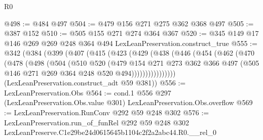 \begin{lexlean}{R0}
\begin{coremodule}
@498 := @484 @497
@504 := @479 @156 @271 @275 @362 @368 @497
@505 := @387 @152
@510 := @505 @155 @271 @274 @364 @367
@520 := @345 @149 @17 @146 @269 @269 @248 @364 @494 LexLeanPreservation.construct_true
@555 := @342
    (@384
      (@399
        (@407
          (@415
            (@423
              (@429
                (@438
                  (@446
                    (@454
                      (@462
                        (@470
                          (@478
                            (@498
                              (@504
                                (@510
                                  @520
                                  (@479
                                    @154
                                    @271
                                    @273
                                    @362
                                    @366
                                    @497
                                    (@505 @146 @271 @269 @364 @248 @520 @494))))))))))))))))
      (LexLeanPreservation.construct_adt @59 @381))
@556 := LexLeanPreservation.Obs
@564 := cond.{1} @556 @297 (LexLeanPreservation.Obs.value @301) LexLeanPreservation.Obs.overflow
@569 := LexLeanPreservation.RunConv @292 @59 @248 @302
@576 := LexLeanPreservation.run_of_funRel
    @292
    @59
    @248
    @302
    LexLeanPreserve.C1e29be24d0615645b1104c2f2a2abc44.R0.__rel_0
\end{coremodule}
\end{lexlean}
